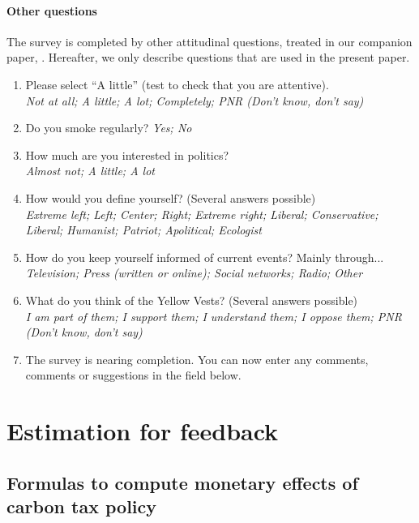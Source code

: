 \documentclass[12pt]{article} %
\begin{document}
\begin{appendices}
\paragraph{Other questions}

The survey is completed by other attitudinal questions, treated in
our companion paper, \citet{douenne_french_2019}. Hereafter, we only describe questions
that are used in the present paper.
\begin{enumerate}[resume,leftmargin=*]
\item Please select ``A little'' (test to check that you are attentive).
\emph{}\\
\emph{Not at all; A little; A lot; Completely; PNR (Don't know, don't
say)}
\item Do you smoke regularly? \emph{Yes; No}
\item How much are you interested in politics? \emph{}\\
\emph{Almost not; A little; A lot }
\item How would you define yourself? (Several answers possible) \emph{}\\
\emph{Extreme left; Left; Center; Right; Extreme right; Liberal; Conservative;
Liberal; Humanist; Patriot; Apolitical; Ecologist }
\item How do you keep yourself informed of current events? Mainly through...
\emph{}\\
\emph{Television; Press (written or online); Social networks; Radio;
Other}
\item What do you think of the Yellow Vests? (Several answers possible)
\emph{}\\
\emph{I am part of them; I support them; I understand them; I oppose
them; PNR (Don't know, don't say)}
\item The survey is nearing completion. You can now enter any comments,
comments or suggestions in the field below.
\end{enumerate}

\section{Estimation for feedback \label{subsec:app_estimation_feedback}}

    \subsection{Formulas to compute monetary effects of carbon tax policy \label{appendix:formulas}}


\end{appendices}
\end{document}
